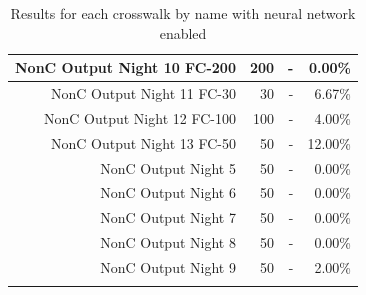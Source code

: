 \documentclass[12pt]{ucthesis}
\begin{document}
\begin{longtable}{|r|r|r|r|}
    \hline
    NonC Output Night 10 FC-200 & 200 & -  & 0.00\% \bigstrut\\
    \hline
    NonC Output Night 11 FC-30 & 30 & -  & 6.67\% \bigstrut\\
    \hline
    NonC Output Night 12 FC-100 & 100 & -  & 4.00\% \bigstrut\\
    \hline
    NonC Output Night 13 FC-50 & 50 & -  & 12.00\% \bigstrut\\
    \hline
    NonC Output Night 5 & 50 & -  & 0.00\% \bigstrut\\
    \hline
    NonC Output Night 6 & 50 & -  & 0.00\% \bigstrut\\
    \hline
    NonC Output Night 7 & 50 & -  & 0.00\% \bigstrut\\
    \hline
    NonC Output Night 8 & 50 & -  & 0.00\% \bigstrut\\
    \hline
    NonC Output Night 9 & 50 & -  & 2.00\% \bigstrut\\
    \hline

    \caption{Results for each crosswalk by name with neural network enabled}
    \label{tab:appendixcrosswalkresults} 
    \end{longtable}
\end{document}
